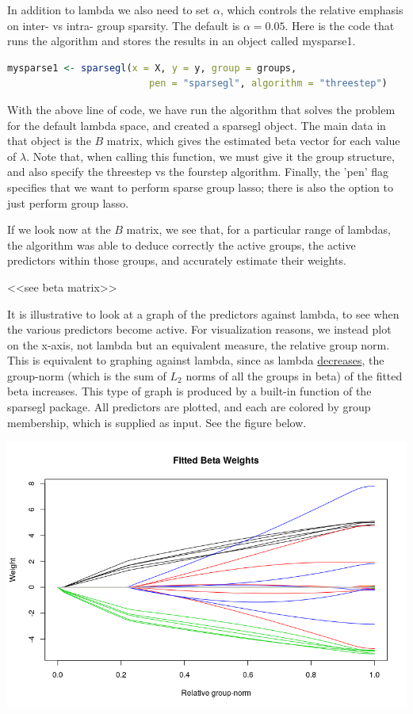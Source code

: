 \documentclass[titlepage]{article}
\begin{document}
In addition to lambda we also need to set $\alpha$, which controls the relative emphasis on inter- vs intra- group sparsity. The default is $\alpha = 0.05$. Here is the code that runs the algorithm and stores the results in an object called mysparse1.

\begin{lstlisting}[language=R]
mysparse1 <- sparsegl(x = X, y = y, group = groups,
                         pen = "sparsegl", algorithm = "threestep")
\end{lstlisting}
With the above line of code, we have run the algorithm that solves the problem for the default lambda space, and created a sparsegl object. The main data in that object is the $B$ matrix, which gives the estimated beta vector for each value of $\lambda$. Note that, when calling this function, we must give it the group structure, and also specify the threestep vs the fourstep algorithm. Finally, the 'pen' flag specifies that we want to perform sparse group lasso; there is also the option to just perform group lasso.

If we look now at the $B$ matrix, we see that, for a particular range of lambdas, the algorithm was able to deduce correctly the active groups, the active predictors within those groups, and accurately estimate their weights.

<<see beta matrix>>

It is illustrative to look at a graph of the predictors against lambda, to see when the various predictors become active. For visualization reasons, we instead plot on the x-axis, not lambda but an equivalent measure, the relative group norm. This is equivalent to graphing against lambda, since as lambda \underline{decreases}, the group-norm (which is the sum of $L_2$ norms of all the groups in beta) of the fitted beta increases. This type of graph is produced by a built-in function of the sparsegl package. All predictors are plotted, and each are colored by group membership, which is supplied as input. See the figure below.

\includegraphics[scale=0.5]{fitted_beta_weights.png}
\end{document}
